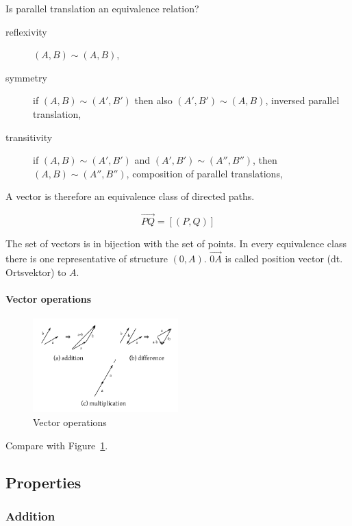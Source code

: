 \documentclass[a4paper,landscape,twocolumn]{article}
\begin{document}
Is parallel translation an equivalence relation?
\begin{description}
  \item[reflexivity]
    $(A, B) \sim (A, B)$, \checkmark
  \item[symmetry]
    if $(A, B) \sim (A', B')$ then also $(A', B') \sim (A, B)$,
    inversed parallel translation,
    \checkmark
  \item[transitivity]
    if $(A, B) \sim (A', B')$ and $(A', B') \sim (A'', B'')$, then $(A, B) \sim (A'', B'')$,
    composition of parallel translations, \checkmark
\end{description}

A vector is therefore an equivalence class of directed paths.

\[ \overrightarrow{PQ} = [(P, Q)] \]

The set of vectors is in bijection with the set of points.
In every equivalence class there is one representative of structure $(0, A)$.
$\overrightarrow{0A}$ is called position vector (dt. Ortsvektor) to $A$.

\paragraph{Vector operations}
\begin{figure}[!h]
  \begin{center}
    \includegraphics[width=0.5\textwidth]{img/vector_operations.pdf}
    \caption{Vector operations}
    \label{img:vector-operations}
  \end{center}
\end{figure}

Compare with Figure~\ref{img:vector-operations}.

\subsection{Properties}

\subsubsection{Addition}
\end{document}
